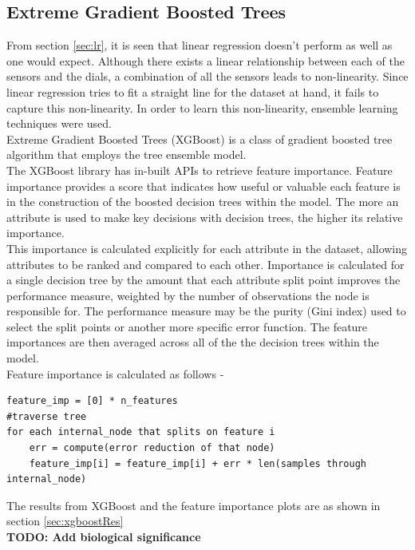 \documentclass[12pt,chapterheads]{ucsd}
\begin{document}
\subsection{Extreme Gradient Boosted Trees}\label{sec:xgboost}
From section \ref{sec:lr}, it is seen that linear regression doesn't perform as well as one would expect. Although there exists a linear relationship between each of the sensors and the dials, a combination of all the sensors leads to non-linearity. Since linear regression tries to fit a straight line for the dataset at hand, it fails to capture this non-linearity. In order to learn this non-linearity, ensemble learning techniques were used.\\
Extreme Gradient Boosted Trees \string(XGBoost) \cite{Chen:2016:XST:2939672.2939785} is a class of gradient boosted tree algorithm that employs the tree ensemble model.\\
The XGBoost library has in-built APIs to retrieve feature importance. Feature importance provides a score that indicates how useful or valuable each feature is in the construction of the boosted decision trees within the model. The more an attribute is used to make key decisions with decision trees, the higher its relative importance.\\
This importance is calculated explicitly for each attribute in the dataset, allowing attributes to be ranked and compared to each other. Importance is calculated for a single decision tree by the amount that each attribute split point improves the performance measure, weighted by the number of observations the node is responsible for. The performance measure may be the purity (Gini index) used to select the split points or another more specific error function. The feature importances are then averaged across all of the the decision trees within the model.\\
Feature importance is calculated as follows -
\begin{verbatim}
feature_imp = [0] * n_features
#traverse tree
for each internal_node that splits on feature i
    err = compute(error reduction of that node)
    feature_imp[i] = feature_imp[i] + err * len(samples through internal_node)
\end{verbatim}
The results from XGBoost and the feature importance plots are as shown in section \ref{sec:xgboostRes}\\
\textbf{TODO: Add biological significance}
\end{document}
